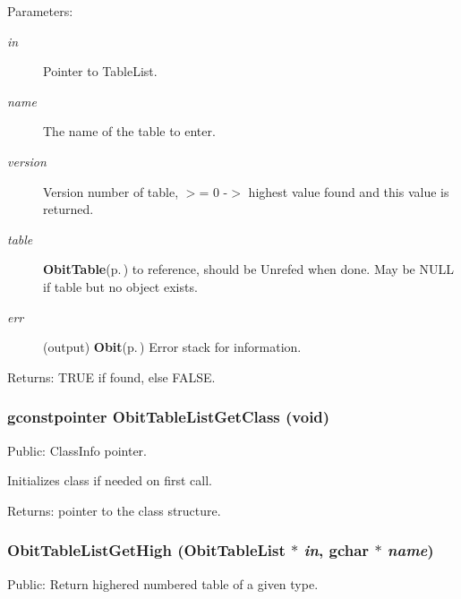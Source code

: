 \begin{Desc}
\item[Parameters:]
\begin{description}
\item[{\em in}]Pointer to Table\-List. \item[{\em name}]The name of the table to enter. \item[{\em version}]Version number of table, $>$= 0 -$>$ highest value found and this value is returned. \item[{\em table}]{\bf Obit\-Table}{\rm (p.\,\pageref{structObitTable})} to reference, should be Unrefed when done. May be NULL if table but no object exists. \item[{\em err}](output) {\bf Obit}{\rm (p.\,\pageref{structObit})} Error stack for information. \end{description}
\end{Desc}
\begin{Desc}
\item[Returns:]TRUE if found, else FALSE. \end{Desc}
\subsubsection{\setlength{\rightskip}{0pt plus 5cm}gconstpointer Obit\-Table\-List\-Get\-Class (void)}\label{ObitTableList_8h_a10}


Public: Class\-Info pointer. 

Initializes class if needed on first call. \begin{Desc}
\item[Returns:]pointer to the class structure. \end{Desc}
\subsubsection{ Obit\-Table\-List\-Get\-High ({\bf Obit\-Table\-List} $\ast$ {\em in}, gchar $\ast$ {\em name})}\label{ObitTableList_8h_a15}


Public: Return highered numbered table of a given type. 

